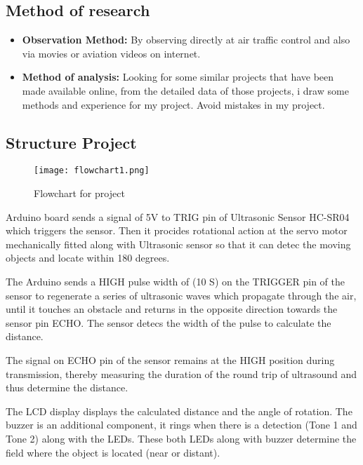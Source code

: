 \documentclass[13pt,a4paper]{report}
\begin{document}
    \subsection{Method of research}
        \begin{itemize}
            \item \textbf{Observation Method:} By observing directly at air traffic control 
        and also via movies or aviation videos on internet.
            \item \textbf{Method of analysis:} Looking for some similar projects that have 
        been made available online, from the detailed data of those projects, i draw some 
        methods and experience for my project. Avoid mistakes in my project.
        \end{itemize}
    \subsection{Structure Project}
        \begin{figure}[H]
            \centering
            \texttt{[image: flowchart1.png]}
            \caption{\label{fig:flowchart}Flowchart for project}
        \end{figure}
        \large{
                    Arduino board sends a signal of 5V to TRIG pin of Ultrasonic Sensor HC-SR04 
                which triggers the sensor. Then it procides rotational action at the servo motor mechanically 
                fitted along with Ultrasonic sensor so that it can detec the moving objects and locate within 
                180 degrees. \\ 
                \vspace{1mm}
                \par The Arduino sends a HIGH pulse width of (10 S) on the TRIGGER pin of the sensor to 
                regenerate  a series of ultrasonic waves which propagate through the air, until it touches 
                an obstacle and returns in the opposite direction towards the sensor pin ECHO. The sensor 
                detecs the width of the pulse to calculate the distance. \\
                \vspace{1mm}
                \par The signal on ECHO pin of the sensor remains at the HIGH position during transmission, 
                thereby measuring the duration of the round trip of ultrasound and thus determine the distance. \\
                \vspace{1mm}
                \par The LCD display displays the calculated distance and the angle of rotation. The buzzer 
                is an additional component, it rings when there is a detection (Tone 1 and Tone 2) along 
                with the LEDs. These both LEDs along with buzzer determine the field where the object is 
                located (near or distant). \\}
\end{document}
